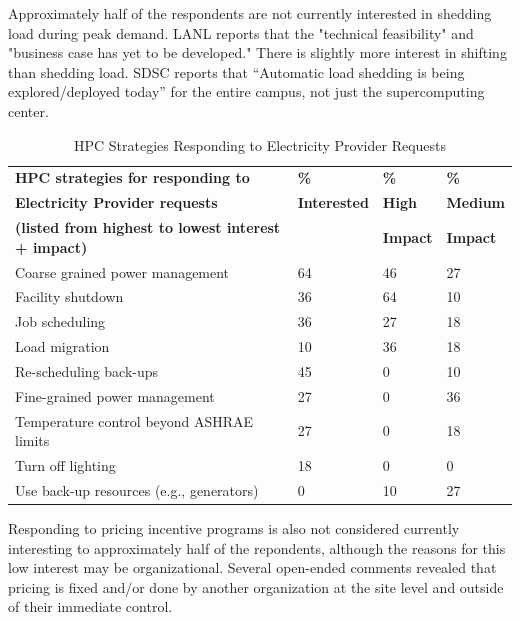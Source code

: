 Approximately half of the respondents are not currently interested in shedding
load during peak demand. LANL reports that the "technical feasibility" and "business case has yet to be developed."
There is slightly more interest in shifting than shedding load. SDSC reports that
 ``Automatic load shedding is being
explored/deployed today'' for the entire campus, not just the supercomputing center.

\begin{table}[htbp]
\centering
\caption{HPC Strategies Responding to Electricity Provider Requests}
\begin{tabular}{|p{2.5in}|p{0.75in}|p{0.75in}|p{0.75in}|} \hline

\textbf{HPC strategies for responding to} &
\textbf{\%} &
\textbf{\%} &
\textbf{\%} \\

\textbf{Electricity Provider requests} &
\textbf{Interested} &
\textbf{High} &
\textbf{Medium} \\

\textbf{(listed from highest to lowest interest + impact)} &
 &
\textbf{Impact} & 
\textbf{Impact} \\
\hline

Coarse grained power management &
64 &
46 &
27 \\
\hline

Facility shutdown&
36 &
64 &
10 \\
\hline

Job scheduling&
36 &
27 &
18 \\
\hline

Load migration &
10 &
36 &
18 \\
\hline

Re-scheduling back-ups &
45 &
0 &
10 \\
\hline

Fine-grained power management &
27 &
0 &
36 \\
\hline

Temperature control beyond ASHRAE limits &
27 &
0 &
18 \\
\hline

Turn off lighting &
18 &
0 &
0 \\
\hline

Use back-up resources (e.g., generators) &
0 &
10 &
27 \\
\hline

\end{tabular}
\label{tab3}
\end{table}
Responding to pricing incentive programs is also not considered currently interesting to approximately half of the repondents,
although the reasons for this low interest may be organizational. Several
open-ended comments revealed that pricing is fixed and/or done by another
organization at the site level and outside of their immediate control.

